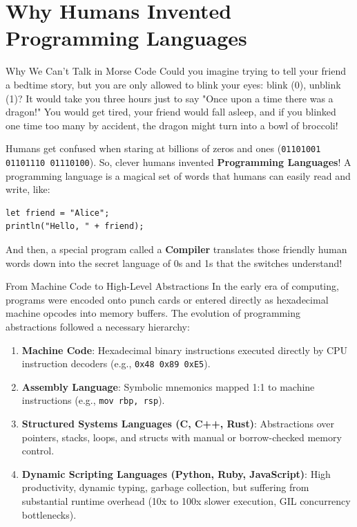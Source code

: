 \section{Why Humans Invented Programming Languages}

\begin{kidbox}{Why We Can't Talk in Morse Code}
Could you imagine trying to tell your friend a bedtime story, but you are only allowed to blink your eyes: blink (0), unblink (1)?
It would take you three hours just to say "Once upon a time there was a dragon!" You would get tired, your friend would fall asleep, and if you blinked one time too many by accident, the dragon might turn into a bowl of broccoli!

Humans get confused when staring at billions of zeros and ones (\texttt{01101001 01101110 01110100}). 
So, clever humans invented \textbf{Programming Languages}! 
A programming language is a magical set of words that humans can easily read and write, like:
\begin{lstlisting}[language=shaelang]
let friend = "Alice";
println("Hello, " + friend);
\end{lstlisting}
And then, a special program called a \textbf{Compiler} translates those friendly human words down into the secret language of 0s and 1s that the switches understand!
\end{kidbox}

\begin{deepbox}{From Machine Code to High-Level Abstractions}
In the early era of computing, programs were encoded onto punch cards or entered directly as hexadecimal machine opcodes into memory buffers. The evolution of programming abstractions followed a necessary hierarchy:
\begin{enumerate}
    \item \textbf{Machine Code}: Hexadecimal binary instructions executed directly by CPU instruction decoders (e.g., \texttt{0x48 0x89 0xE5}).
    \item \textbf{Assembly Language}: Symbolic mnemonics mapped 1:1 to machine instructions (e.g., \texttt{mov rbp, rsp}).
    \item \textbf{Structured Systems Languages (C, C++, Rust)}: Abstractions over pointers, stacks, loops, and structs with manual or borrow-checked memory control.
    \item \textbf{Dynamic Scripting Languages (Python, Ruby, JavaScript)}: High productivity, dynamic typing, garbage collection, but suffering from substantial runtime overhead (10x to 100x slower execution, GIL concurrency bottlenecks).
\end{enumerate}
\end{deepbox}

